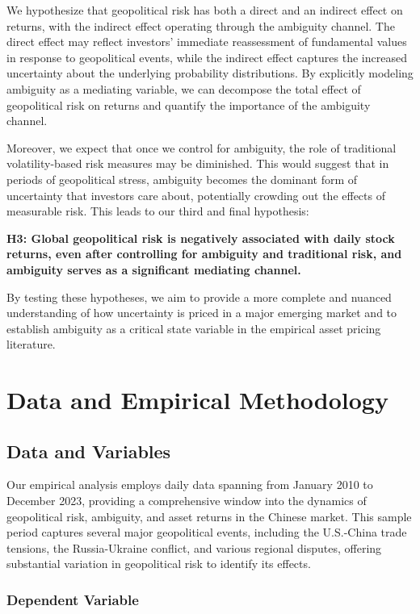 \documentclass[preprint,12pt,authoryear]{elsarticle}
\begin{document}
We hypothesize that geopolitical risk has both a direct and an indirect effect on returns, with the indirect effect operating through the ambiguity channel. The direct effect may reflect investors' immediate reassessment of fundamental values in response to geopolitical events, while the indirect effect captures the increased uncertainty about the underlying probability distributions. By explicitly modeling ambiguity as a mediating variable, we can decompose the total effect of geopolitical risk on returns and quantify the importance of the ambiguity channel.

Moreover, we expect that once we control for ambiguity, the role of traditional volatility-based risk measures may be diminished. This would suggest that in periods of geopolitical stress, ambiguity becomes the dominant form of uncertainty that investors care about, potentially crowding out the effects of measurable risk. This leads to our third and final hypothesis:

\textbf{H3: Global geopolitical risk is negatively associated with daily stock returns, even after controlling for ambiguity and traditional risk, and ambiguity serves as a significant mediating channel.}

By testing these hypotheses, we aim to provide a more complete and nuanced understanding of how uncertainty is priced in a major emerging market and to establish ambiguity as a critical state variable in the empirical asset pricing literature.

\section{Data and Empirical Methodology}

\subsection{Data and Variables}

Our empirical analysis employs daily data spanning from January 2010 to December 2023, providing a comprehensive window into the dynamics of geopolitical risk, ambiguity, and asset returns in the Chinese market. This sample period captures several major geopolitical events, including the U.S.-China trade tensions, the Russia-Ukraine conflict, and various regional disputes, offering substantial variation in geopolitical risk to identify its effects.

\subsubsection{Dependent Variable}
\end{document}
